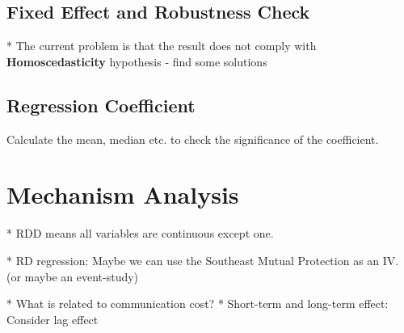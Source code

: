 \documentclass[english,10pt,a4paper]{article}
\begin{document}
	\subsection{Fixed Effect and Robustness Check}
	* The current problem is that the result does not comply with \textbf{Homoscedasticity} hypothesis - find some solutions
	\subsection{Regression Coefficient}
	Calculate the mean, median etc. to check the significance of the coefficient.
	\section{Mechanism Analysis}
	* RDD means all variables are continuous except one.\par
	* RD regression: Maybe we can use the Southeast Mutual Protection as an IV. (or maybe an event-study)\par
	* What is related to communication cost?
	* Short-term and long-term effect: Consider lag effect
\end{document}
